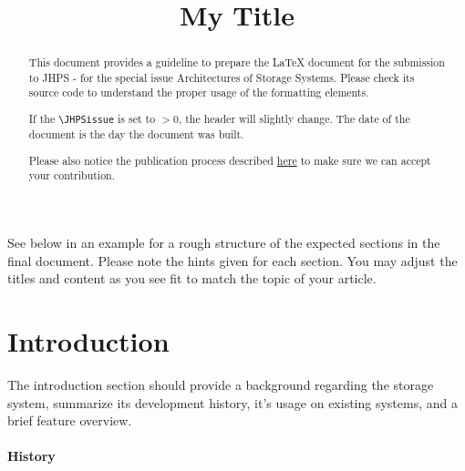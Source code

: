 \documentclass{jhps}
\begin{document}



\title{My Title}

\maketitle

\begin{abstract}
This document provides a guideline to prepare the LaTeX document for the submission to JHPS - for the special issue Architectures of Storage Systems.
Please check its source code to understand the proper usage of the formatting elements.

If the \verb|\JHPSissue| is set to $>0$, the header will slightly change.
The date of the document is the day the document was built.

Please also notice the publication process described \href{https://jhps.vi4io.org/authors/#detailed-publication-process}{here} to make sure we can accept your contribution.
\end{abstract}


See below in  an example for a rough structure of the expected sections in the final document.
Please note the hints given for each section. You may adjust the titles and content as you see fit to match the topic of your article.

\section{Introduction} \label{sec:intro}
The introduction section should provide a background regarding the storage system, summarize its development history, it’s usage on existing systems, and a brief feature overview.

\paragraph{History}
\end{document}

